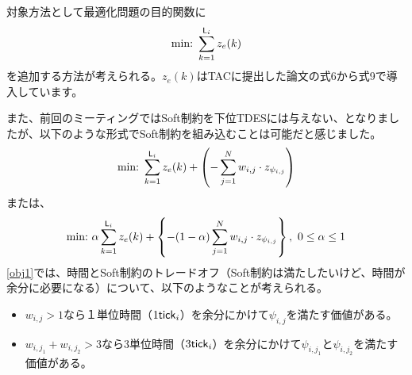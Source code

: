 \documentclass[ 10pt]{jsarticle}
\newcommand{\req}[1]{\eqref{#1}}
\newcommand{\tick}{{\sf tick}}
\newcommand{\Len}{{\sf L}}
\begin{document}
対象方法として最適化問題の目的関数に
\begin{align}
\mbox{min:}~\sum_{k=1}^{\Len_i}z_e(k)
\end{align}
を追加する方法が考えられる。$z_e(k)$はTACに提出した論文の式6から式9で導入しています。

また、前回のミーティングではSoft制約を下位TDESには与えない、となりましたが、以下のような形式でSoft制約を組み込むことは可能だと感じました。
\begin{align}\label{obj1}
\mbox{min:}~\sum_{k=1}^{\Len_i}z_e(k) + \left(-\sum_{j=1}^N w_{i,j}\cdot z_{\psi_{i,j}}\right)
\end{align}
または、
\begin{align}
\mbox{min:}~\alpha\sum_{k=1}^{\Len_i}z_e(k) + \left\{-(1-\alpha)\sum_{j=1}^N w_{i,j}\cdot z_{\psi_{i,j}}\right\},~0\leq \alpha\leq 1
\end{align}
%
\req{obj1}では、時間とSoft制約のトレードオフ（Soft制約は満たしたいけど、時間が余分に必要になる）について、以下のようなことが考えられる。
\begin{itemize}
\item
$w_{i,j}>1$なら１単位時間（$1\tick_i$）を余分にかけて$\psi_{i,j}$を満たす価値がある。
\item
$w_{i,j_1}+w_{i,j_2}>3$なら3単位時間（$3\tick_i$）を余分にかけて$\psi_{i,j_1}$と$\psi_{i,j_2}$を満たす価値がある。
\end{itemize}
%
%
\end{document}
